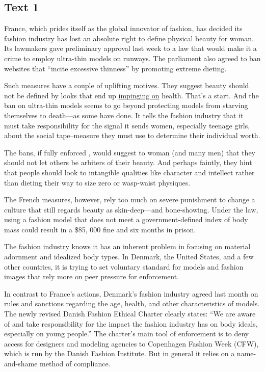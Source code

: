 \newpage
\subsection{Text 1}


France, which prides itself as the global innovator of fashion,
has decided its fashion industry has lost an absolute right to define
physical beauty for woman. Its lawmakers gave preliminary approval last
week to a law that would make it a crime to employ ultra-thin models on
runways. The parliament also agreed to ban websites that ``incite
excessive thinness'' by promoting extreme dieting.

Such measures have a couple of uplifting motives. They suggest
beauty should not be defined by looks that end up \uline{impinging on} health.
That's a start. And the ban on ultra-thin models seems to go beyond
protecting models from starving themselves to death---as some have
done. It tells the fashion industry that it must take responsibility for
the signal it sends women, especially teenage girls, about the social
tape--measure they must use to determine their individual worth.

The bans, if fully enforced , would suggest to woman (and many men) that they should not let others be arbiters of their beauty. And
perhaps faintly, they hint that people should look to intangible
qualities like character and intellect rather than dieting their way to
size zero or wasp-waist physiques.

The French measures, however, rely too much on severe punishment to
change a culture that still regards beauty as skin-deep---and
bone-showing. Under the law, using a fashion model that does not meet
a government-defined index of body mass could result in a \$85, 000 fine
and six months in prison.

The fashion industry knows it has an inherent problem in focusing on
material adornment and idealized body types. In Denmark, the United
States, and a few other countries, it is trying to set voluntary
standard for models and fashion images that rely more on peer pressure
for enforcement.

In contrast to France's actions, Denmark's fashion industry agreed last
month on rules and sanctions regarding the age, health, and other
characteristics of models. The newly revised Danish Fashion Ethical
Charter clearly states: ``We are aware of and take responsibility for
the impact the fashion industry has on body ideals, especially on young
people.'' The charter's main tool of enforcement is to deny access for
designers and modeling agencies to Copenhagen Fashion Week (CFW), which is
run by the Danish Fashion Institute. But in general it relies on a
name-and-shame method of compliance.

